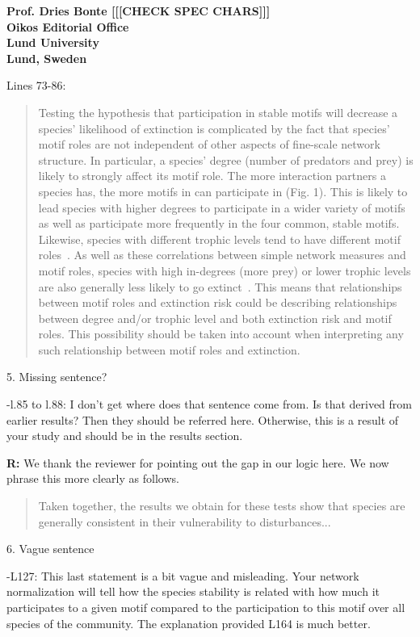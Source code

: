 \documentclass[12pt]{letter}
\begin{document}
\begin{letter}{\bf Prof. Dries Bonte [[[CHECK SPEC CHARS]]]\\
Oikos Editorial Office \\
Lund University \\
Lund, Sweden}
        
        Lines 73-86:
      
        \begin{quotation}
            Testing the hypothesis that participation in stable motifs will decrease a species' likelihood of extinction is complicated by the fact that species' motif roles are not independent of other aspects of fine-scale network structure. 
            In particular, a species' degree (number of predators and prey) is likely to strongly affect its motif role.
            The more interaction partners a species has, the more motifs in can participate in (Fig. 1).
            This is likely to lead species with higher degrees to participate in a wider variety of motifs as well as participate more frequently in the four common, stable motifs.
            Likewise, species with different trophic levels tend to have different motif roles~\citep{Cirtwill2018EcolLett}.
            As well as these correlations between simple network measures and motif roles, species with high in-degrees (more prey) or lower trophic levels are also generally less likely to go extinct~\citep{Cirtwill2018FoodWebs}.
            This means that relationships between motif roles and extinction risk could be describing relationships between degree and/or trophic level and both extinction risk and motif roles.
            This possibility should be taken into account when interpreting any such relationship between motif roles and extinction.
        \end{quotation}
      

    5. Missing sentence?

      -l.85 to l.88: I don't get where does that sentence come from. Is that derived from earlier results? Then they should be referred here. Otherwise, this is a result of your study and should be in the results section.

      \textbf{R:} 
     We thank the reviewer for pointing out the gap in our logic here. We now phrase this more clearly as follows.
      
     \begin{quotation}
         Taken together, the results we obtain for these tests show that species are generally consistent in their vulnerability to disturbances...
     \end{quotation}



    6. Vague sentence

      -L127: This last statement is a bit vague and misleading. Your network normalization will tell how the species stability is related with how much it participates to a given motif compared to the participation to this motif over all species of the community. The explanation provided L164 is much better.


\end{letter}
\end{document}
